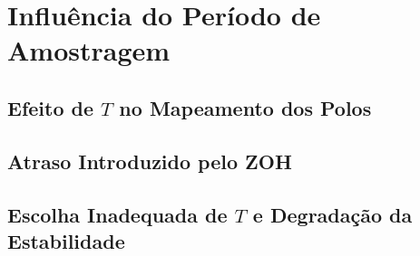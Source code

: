 \chapter{Influência do Período de Amostragem}
\label{cap:amostragem}

\section{Efeito de \texorpdfstring{$T$}{T} no Mapeamento dos Polos}


\section{Atraso Introduzido pelo ZOH}


\section{Escolha Inadequada de \texorpdfstring{$T$}{T} e Degradação da Estabilidade}

